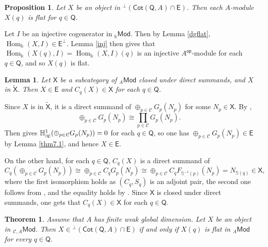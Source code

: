 \documentclass{amsart}
\theoremstyle{bfupright head,slanted body}
\theoremstyle{bfupright head,upright body}
\theoremstyle{fixed bf head,slanted body}
\newtheorem{thm}[res]{Theorem}          \newtheorem*{thm*}{Theorem}
\newtheorem{prp}[res]{Proposition}      \newtheorem*{prp*}{Proposition}
\newtheorem{lem}[res]{Lemma}            \newtheorem*{lem*}{Lemma}
\theoremstyle{fixed bf head,upright body}
\theoremstyle{numbered paragraph}
\newenvironment{prf*}[1][Proof]{%
	\begin{proof}[\bf #1]
		\setcounter{equation}{0}
		\renewcommand{\theequation}{\arabic{equation}}}
	{\end{proof}
}
\numberwithin{equation}{res}
\newcommand{\Cot}[1]{\mathsf{Cot}(#1)}
\newcommand{\Mod}[1]{{_{#1}\mathsf{Mod}}}
\newcommand{\Hom}[3][]{\operatorname{Hom}_{#1}(#2,#3)}
\newcommand{\cH}[2][1]{\mathbb{H}^{#1}_{\textnormal{\tiny[}#2\textnormal{\tiny]}}}
\newcommand{\E}{\mathsf{E}}
\newcommand{\X}{\mathsf{X}}
\newcommand{\C}{\mathcal{C}}
\newcommand{\Q}{\mathsf{Q}}
\newcommand{\is}{\cong}
\newcommand{\Aop}{A^{\mathsf{op}}}
\begin{document}
\begin{prp}\label{cofibrant}
Let $X$ be an object in $^\perp(\Cot{\Q,A}\cap\E)$. Then each $A$-module $X(q)$ is flat for $q\in\Q$.
\end{prp}

\begin{prf*}
Let $I$ be an injective cogenerator in $\Mod{\Bbbk}$. Then by Lemma \ref{dgflat}, $\Hom[\Bbbk]{X}{I}\in\E^\perp$. Lemma \ref{inj} then gives that  $\Hom[\Bbbk]{X(q)}{I}=\Hom[\Bbbk]{X}{I}(q)$ is an injective $\Aop$-module for each $q\in\Q$, and so $X(q)$ is flat.
\end{prf*}

\begin{lem}\label{Add}
Let $\X$ be a subcategory of $\Mod{A}$ closed under direct summands, and $X$ in ${\widetilde{\X}}$. Then $X\in\E$ and $C_q(X)\in\X$ for each $q\in\Q$.
\end{lem}

\begin{prf*}
Since $X$ is in ${\widetilde{\X}}$, it is a direct summand of $\oplus_{p\in\C}G_p(N_p)$ for some $N_p\in\X$. By \cite[Proposition 3.7]{HJ23},
\[
\oplus_{p\in\C}G_p(N_p)\is\prod_{p\in\C}G_p(N_p).
\]
Then \cite[Lemma 7.14]{HJ21} gives $\cH[1]{q}(\oplus_{p\in\C}G_p(N_p))=0$ for each $q\in\Q$, so one has $\oplus_{p\in\C}G_p(N_p)\in\E$ by Lemma \ref{thm7.1}, and hence $X\in\E$.

On the other hand, for each $q\in\Q$, $C_q(X)$ is a direct summand of $$C_q(\oplus_{p\in\C}G_p(N_p))\is\oplus_{p\in\C}C_qG_p(N_p)\is \oplus_{p\in\C}C_qF_{\mathbb{S}^{-1}(p)}(N_p)=N_{\mathbb{S}(q)}\in\X,$$
where the first isomorphism holds as $(C_q,S_q)$ is an adjoint pair, the second one follows from \cite[Lemma 3.4]{HJ23}, and the equality holds by \cite[Lemma 7.28(a)]{HJ21}. Since $\X$ is closed under direct summands, one gets that $C_q(X)\in\X$ for each $q\in\Q$.
\end{prf*}

\begin{thm}\label{cofibrant object}
Assume that $A$ has finite weak global dimension. Let $X$ be an object in $\Mod{\C,A}$. Then $X\in{^\perp(\Cot{\Q,A}\cap\E)}$ if and only if $X(q)$ is flat in $\Mod{A}$ for every $q\in\Q$.
\end{thm}
\end{document}
